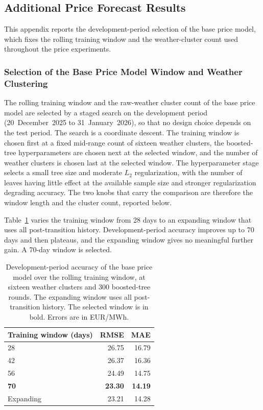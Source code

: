 \FloatBarrier

\subsection{Additional Price Forecast Results}
\label{app:price_results}

This appendix reports the development-period selection of the base price model,
which fixes the rolling training window and the weather-cluster count used
throughout the price experiments.

\subsubsection{Selection of the Base Price Model Window and Weather Clustering}
\label{app:price_base_selection}

The rolling training window and the raw-weather cluster count of the base
price model are selected by a staged search on the development period
(20~December~2025 to 31~January~2026), so that no design choice depends on the
test period. The search is a coordinate descent. The training window is chosen
first at a fixed mid-range count of sixteen weather clusters, the boosted-tree
hyperparameters are chosen next at the selected window, and the number of
weather clusters is chosen last at the selected window. The hyperparameter stage
selects a small tree size and moderate \(L_2\) regularization, with the number of
leaves having little effect at the available sample size and stronger
regularization degrading accuracy. The two knobs that carry the comparison are
therefore the window length and the cluster count, reported below.

Table~\ref{tab:price_base_window} varies the training window from 28 days to an
expanding window that uses all post-transition history. Development-period
accuracy improves up to 70 days and then plateaus, and the expanding window
gives no meaningful further gain. A 70-day window is selected.

\begin{table}[H]
  \centering
  \small
  \caption[Base price model training-window selection.]
  {Development-period accuracy of the base price model over the rolling
  training window, at sixteen weather clusters and 300 boosted-tree rounds. The
  expanding window uses all post-transition history. The selected window is in
  bold. Errors are in EUR/MWh.}
  \label{tab:price_base_window}
  \begin{tabular}{@{}lrr@{}}
    \toprule
    Training window (days) & RMSE & MAE \\
    \midrule
    28        & 26.75 & 16.79 \\
    42        & 26.37 & 16.36 \\
    56        & 24.49 & 14.75 \\
    \textbf{70} & \textbf{23.30} & \textbf{14.19} \\
    Expanding & 23.21 & 14.28 \\
    \bottomrule
  \end{tabular}
\end{table}


